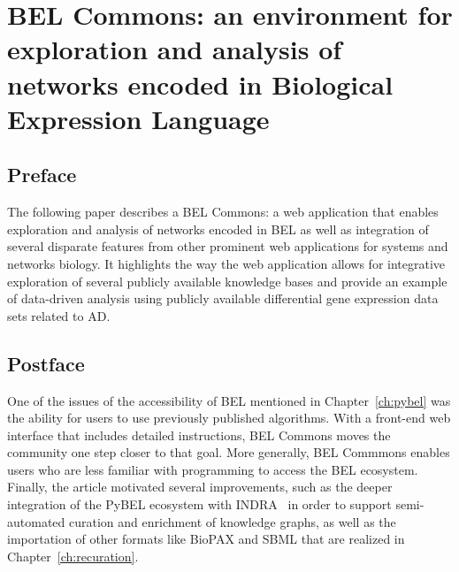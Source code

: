 \chapter{BEL Commons: an environment for exploration and analysis of networks encoded in Biological Expression Language}\label{ch:belcommons}

\section*{Preface}

The following paper describes a BEL Commons: a web application that enables exploration and analysis of networks encoded in \ac{BEL} as well as integration of several disparate features from other prominent web applications for systems and networks biology.
It highlights the way the web application allows for integrative exploration of several publicly available knowledge bases and provide an example of data-driven analysis using publicly available differential gene expression data sets related to \ac{AD}.

\vspace*{\fill}



\section*{Postface}

One of the issues of the accessibility of \ac{BEL} mentioned in Chapter~\ref{ch:pybel} was the ability for users to use previously published algorithms.
With a front-end web interface that includes detailed instructions, BEL Commons moves the community one step closer to that goal.
More generally, BEL Commmons enables users who are less familiar with programming to access the \ac{BEL} ecosystem.
Finally, the article motivated several improvements, such as the deeper integration of the PyBEL ecosystem with \ac{INDRA}~\cite{Gyori2017} in order to support semi-automated curation and enrichment of knowledge graphs, as well as the importation of other formats like \ac{BioPAX} and \ac{SBML} that are realized in Chapter~\ref{ch:recuration}.
